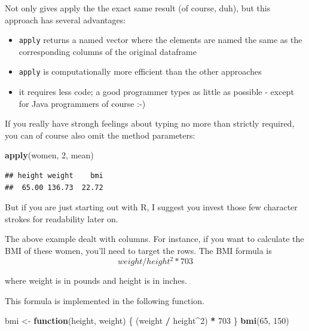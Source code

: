\documentclass[]{book}
\newenvironment{Shaded}{\begin{snugshade}}{\end{snugshade}}
\newcommand{\ControlFlowTok}[1]{\textcolor[rgb]{0.13,0.29,0.53}{\textbf{#1}}}
\newcommand{\DecValTok}[1]{\textcolor[rgb]{0.00,0.00,0.81}{#1}}
\newcommand{\KeywordTok}[1]{\textcolor[rgb]{0.13,0.29,0.53}{\textbf{#1}}}
\newcommand{\NormalTok}[1]{#1}
\newcommand{\OperatorTok}[1]{\textcolor[rgb]{0.81,0.36,0.00}{\textbf{#1}}}
\newcommand{\StringTok}[1]{\textcolor[rgb]{0.31,0.60,0.02}{#1}}
\providecommand{\tightlist}{%
  \setlength{\itemsep}{0pt}\setlength{\parskip}{0pt}}
\begin{document}
Not only gives apply the the exact same result (of course, duh), but this approach has several advantages:

\begin{itemize}
\tightlist
\item
  \texttt{apply} returns a named vector where the elements are named the same as the corresponding columns of the original dataframe
\item
  \texttt{apply} is computationally more efficient than the other approaches
\item
  it requires less code; a good programmer types as little as possible - except for Java programmers of course :-)
\end{itemize}

If you really have strongh feelings about typing no more than strictly required, you can of course also omit the method parameters:

\begin{Shaded}
\begin{Highlighting}[]
\KeywordTok{apply}\NormalTok{(women, }\DecValTok{2}\NormalTok{, mean)}
\end{Highlighting}
\end{Shaded}

\begin{verbatim}
## height weight    bmi 
##  65.00 136.73  22.72
\end{verbatim}

But if you are just starting out with R, I suggest you invest those few character strokes for readability later on.

The above example dealt with columns. For instance, if you want to calculate the BMI of these women, you'll need to target the rows.
The BMI formula is
\[weight/height^2*703\]

where weight is in pounds and height is in inches.

This formula is implemented in the following function.

\begin{Shaded}
\begin{Highlighting}[]
\NormalTok{bmi <-}\StringTok{ }\ControlFlowTok{function}\NormalTok{(height, weight) \{}
\NormalTok{    (weight }\OperatorTok{/}\StringTok{ }\NormalTok{height}\OperatorTok{^}\DecValTok{2}\NormalTok{) }\OperatorTok{*}\StringTok{ }\DecValTok{703}
\NormalTok{\}}
\KeywordTok{bmi}\NormalTok{(}\DecValTok{65}\NormalTok{, }\DecValTok{150}\NormalTok{)}
\end{Highlighting}
\end{Shaded}
\end{document}
